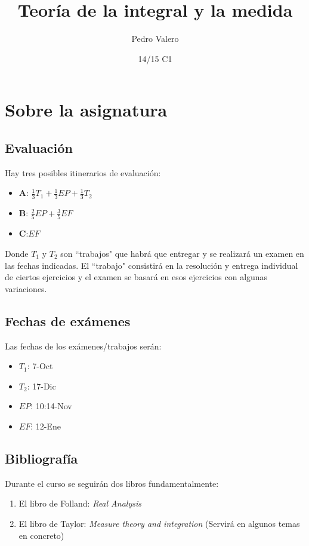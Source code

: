 \documentclass{apuntes}
\title{Teoría de la integral y la medida}
\author{Pedro Valero}
\date{14/15 C1}
\begin{document}
\pagestyle{plain}
\maketitle


\tableofcontents
\newpage

\chapter{Sobre la asignatura}
\section{Evaluación}
Hay tres posibles itinerarios de evaluación:
\begin{itemize}
\item \textbf{A}: $\frac{1}{3}T_1+\frac{1}{3}EP+\frac{1}{3}T_2$
\item \textbf{B}: $\frac{2}{5}EP+ \frac{3}{5}EF$
\item \textbf{C}:$EF$
\end{itemize}
Donde $T_1$  y $T_2$ son ``trabajos" que habrá que entregar y se realizará un examen en las fechas indicadas. El ``trabajo" consistirá en la resolución y entrega individual de ciertos ejercicios y el examen se basará en esos ejercicios con algunas variaciones.

\section{Fechas de exámenes}
Las fechas de los exámenes/trabajos serán:
\begin{itemize}
\item $T_1$: 7-Oct
\item $T_2$: 17-Dic
\item $EP$: 10:14-Nov
\item $EF$: 12-Ene
\end{itemize}

\section{Bibliografía}
Durante el curso se seguirán dos libros fundamentalmente:
\begin{enumerate}
\item El libro de Folland: \textit{Real Analysis}
\item El libro de Taylor: \textit{Measure theory and integration} (Servirá en algunos temas en concreto)
\end{enumerate}
\end{document}
